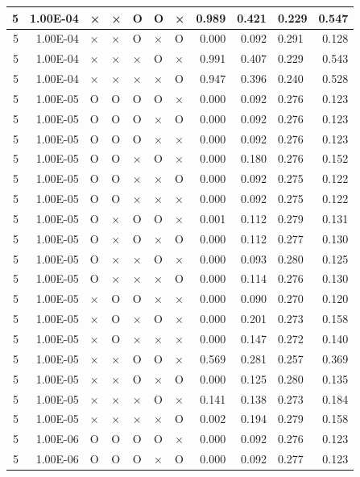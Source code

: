 \documentclass[11pt]{article}
\begin{document}
\begin{longtable}[h]{|r|r|l|l|l|l|l|r|r|l|r|}
5 & 1.00E-04 & × & × & O & O & × & 0.989 & 0.421 & 0.229 & 0.547 \\ \hline
5 & 1.00E-04 & × & × & O & × & O & 0.000 & 0.092 & 0.291 & 0.128 \\ \hline
5 & 1.00E-04 & × & × & × & O & × & 0.991 & 0.407 & 0.229 & 0.543 \\ \hline
5 & 1.00E-04 & × & × & × & × & O & 0.947 & 0.396 & 0.240 & 0.528 \\ \hline
5 & 1.00E-05 & O & O & O & O & × & 0.000 & 0.092 & 0.276 & 0.123 \\ \hline
5 & 1.00E-05 & O & O & O & × & O & 0.000 & 0.092 & 0.276 & 0.123 \\ \hline
5 & 1.00E-05 & O & O & O & × & × & 0.000 & 0.092 & 0.276 & 0.123 \\ \hline
5 & 1.00E-05 & O & O & × & O & × & 0.000 & 0.180 & 0.276 & 0.152 \\ \hline
5 & 1.00E-05 & O & O & × & × & O & 0.000 & 0.092 & 0.275 & 0.122 \\ \hline
5 & 1.00E-05 & O & O & × & × & × & 0.000 & 0.092 & 0.275 & 0.122 \\ \hline
5 & 1.00E-05 & O & × & O & O & × & 0.001 & 0.112 & 0.279 & 0.131 \\ \hline
5 & 1.00E-05 & O & × & O & × & O & 0.000 & 0.112 & 0.277 & 0.130 \\ \hline
5 & 1.00E-05 & O & × & × & O & × & 0.000 & 0.093 & 0.280 & 0.125 \\ \hline
5 & 1.00E-05 & O & × & × & × & O & 0.000 & 0.114 & 0.276 & 0.130 \\ \hline
5 & 1.00E-05 & × & O & O & × & × & 0.000 & 0.090 & 0.270 & 0.120 \\ \hline
5 & 1.00E-05 & × & O & × & O & × & 0.000 & 0.201 & 0.273 & 0.158 \\ \hline
5 & 1.00E-05 & × & O & × & × & × & 0.000 & 0.147 & 0.272 & 0.140 \\ \hline
5 & 1.00E-05 & × & × & O & O & × & 0.569 & 0.281 & 0.257 & 0.369 \\ \hline
5 & 1.00E-05 & × & × & O & × & O & 0.000 & 0.125 & 0.280 & 0.135 \\ \hline
5 & 1.00E-05 & × & × & × & O & × & 0.141 & 0.138 & 0.273 & 0.184 \\ \hline
5 & 1.00E-05 & × & × & × & × & O & 0.002 & 0.194 & 0.279 & 0.158 \\ \hline
5 & 1.00E-06 & O & O & O & O & × & 0.000 & 0.092 & 0.276 & 0.123 \\ \hline
5 & 1.00E-06 & O & O & O & × & O & 0.000 & 0.092 & 0.277 & 0.123 \\ \hline

\end{longtable}
\end{document}
